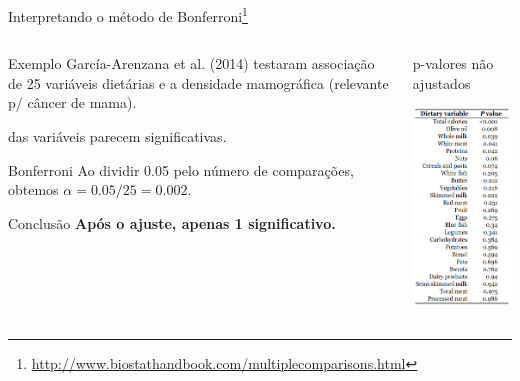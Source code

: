 \documentclass{beamer}
\begin{document}
\begin{frame}{\small Interpretando o método de Bonferroni\footnote{\tiny \url{http://www.biostathandbook.com/multiplecomparisons.html}}}
  \begin{columns}
    \begin{column}{6.5cm}
      \begin{exampleblock}{\footnotesize Exemplo}
        \scriptsize
        García-Arenzana et al. (2014) testaram associação de 25 variáveis dietárias e a densidade mamográfica (relevante p/ câncer de mama).

         das variáveis parecem significativas.
      \end{exampleblock}
      \medskip
      \begin{block}{\footnotesize Bonferroni}
        \scriptsize
        Ao dividir 0.05 pelo número de comparações, obtemos $\alpha = 0.05/25 = 0.002$.
      \end{block}
      \bigskip
      \bigskip
      \begin{block}{\footnotesize Conclusão}
        \footnotesize
        {\bf Após o ajuste, apenas 1 significativo.}
      \end{block}
    \end{column}
    \begin{column}{3.5cm}
      \begin{center}
        {\footnotesize p-valores não ajustados}

        \medskip
        \includegraphics[height=.8\textheight]{Cap13-30/ex-25-testes}
      \end{center}
    \end{column}
  \end{columns}
\end{frame}
\end{document}

